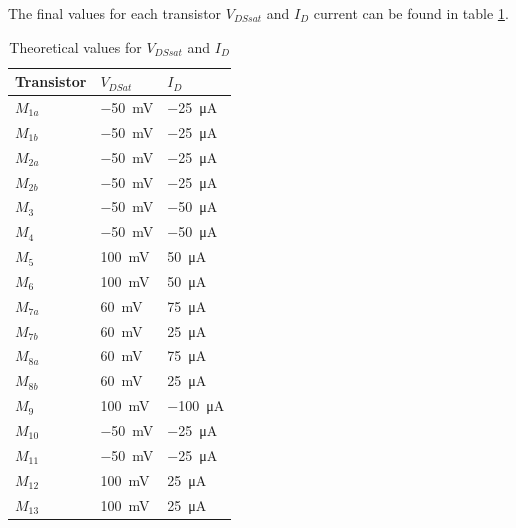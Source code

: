 The final values for each transistor $V_{DSsat}$ and $I_D$ current can be found in table \ref{tab:TeoVDSsatId}.

\begin{table}[H]
    \centering
    \caption{Theoretical values for $V_{DSsat}$ and $I_D$}
    \begin{tabularx}{\textwidth}{>{\centering\arraybackslash}X >{\centering\arraybackslash}X >{\centering\arraybackslash}X}
        \toprule
        \textbf{Transistor} & \textbf{$V_{DSat}$} & \textbf{$I_D$}\\
        \midrule
        $M_{1a}$ & \SI{-50}{\milli\volt} & \SI{-25}{\micro\ampere}\\
        \midrule
        $M_{1b}$ & \SI{-50}{\milli\volt} & \SI{-25}{\micro\ampere}\\
        \midrule
        $M_{2a}$ & \SI{-50}{\milli\volt} & \SI{-25}{\micro\ampere}\\
        \midrule
        $M_{2b}$ & \SI{-50}{\milli\volt} & \SI{-25}{\micro\ampere}\\
        \midrule
        $M_{3}$ & \SI{-50}{\milli\volt} & \SI{-50}{\micro\ampere}\\
        \midrule
        $M_{4}$ & \SI{-50}{\milli\volt} & \SI{-50}{\micro\ampere}\\
        \midrule
        $M_{5}$ & \SI{100}{\milli\volt} & \SI{50}{\micro\ampere}\\
        \midrule
        $M_{6}$ & \SI{100}{\milli\volt} & \SI{50}{\micro\ampere}\\
        \midrule
        $M_{7a}$ & \SI{60}{\milli\volt} & \SI{75}{\micro\ampere}\\
        \midrule
        $M_{7b}$ & \SI{60}{\milli\volt} & \SI{25}{\micro\ampere}\\
        \midrule
        $M_{8a}$ & \SI{60}{\milli\volt} & \SI{75}{\micro\ampere}\\
        \midrule
        $M_{8b}$ & \SI{60}{\milli\volt} & \SI{25}{\micro\ampere}\\
        \midrule
        $M_{9}$ & \SI{100}{\milli\volt} & \SI{-100}{\micro\ampere}\\
        \midrule
        $M_{10}$ & \SI{-50}{\milli\volt} & \SI{-25}{\micro\ampere}\\
        \midrule
        $M_{11}$ & \SI{-50}{\milli\volt} & \SI{-25}{\micro\ampere}\\
        \midrule
        $M_{12}$ & \SI{100}{\milli\volt} & \SI{25}{\micro\ampere}\\
        \midrule
        $M_{13}$ & \SI{100}{\milli\volt} & \SI{25}{\micro\ampere}\\
        \bottomrule
    \end{tabularx}
    \label{tab:TeoVDSsatId}
\end{table}



